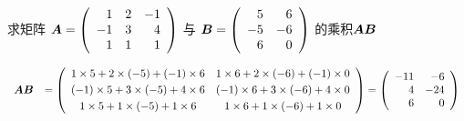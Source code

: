 \begin{frame}
\begin{li}
  求矩阵
  $
  \boldsymbol{A} = \left(
    \begin{array}{rrrr}
      1&2&-1\\
      -1&3&4\\
      1&1&1
    \end{array}
  \right)
  $
  与
  $
  \boldsymbol{B} = \left(
    \begin{array}{rrrr}
      5&6\\
      -5&-6\\
      6&0
    \end{array}
  \right)
  $
  的乘积$\boldsymbol{A}\boldsymbol{B}$
\end{li} \pause
\begin{jie}
  $$
  \begin{array}{cl}
    \boldsymbol{A}\boldsymbol{B} & = \left(
           \begin{array}{ccc}
             1\times5 + 2\times(-5) + (-1)\times6 &
                                                    1\times6 + 2\times(-6) + (-1)\times0 \\[0.1cm]
             (-1)\times5 + 3\times(-5) +    4\times6 &
                                                       (-1)\times6 + 3\times(-6) +    4\times0 \\[0.1cm]
             1\times5 + 1\times(-5) +    1\times6 &
                                                    1\times6 + 1\times(-6) +    1\times0 
           \end{array}
                                                    \right)  =\left(
                                                    \begin{array}{rr}
                                                      -11 & -6\\
                                                      4 & -24\\
                                                      6 & 0
                                                    \end{array}
                                                          \right)   
  \end{array}
  $$
\end{jie}
\end{frame}

